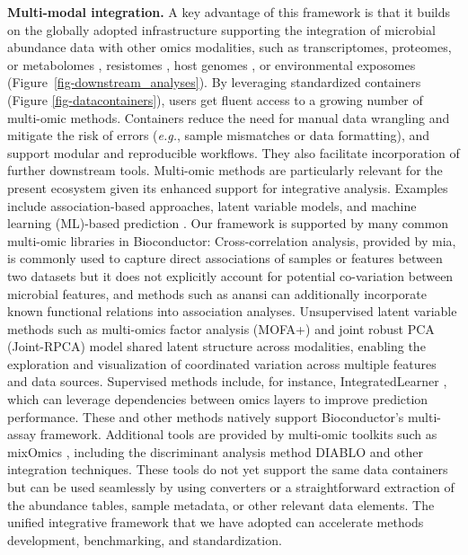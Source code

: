 \documentclass[
  sn-nature,
]{sn-jnl}
\begin{document}
\textbf{Multi-modal integration.} A key advantage of this framework is
that it builds on the globally adopted infrastructure supporting the
integration of microbial abundance data with other omics modalities,
such as transcriptomes, proteomes, or metabolomes
\citep{hintikka2021, mangnier2025}, resistomes
\citep{salehi2025, lee2023}, host genomes \citep{qin2022}, or
environmental exposomes (Figure~\ref{fig-downstream_analyses}). By
leveraging standardized containers (Figure \ref{fig-datacontainers}),
users get fluent access to a growing number of multi-omic methods.
Containers reduce the need for manual data wrangling and mitigate the
risk of errors (\emph{e.g.}, sample mismatches or data formatting), and
support modular and reproducible workflows. They also facilitate
incorporation of further downstream tools. Multi-omic methods are
particularly relevant for the present ecosystem given its enhanced
support for integrative analysis. Examples include association-based
approaches, latent variable models, and machine learning (ML)-based
prediction \citep{sankaran2019, sankaran2019b, sherwani2025}. Our
framework is supported by many common multi-omic libraries in
Bioconductor: Cross-correlation analysis, provided by mia, is commonly
used to capture direct associations of samples or features between two
datasets but it does not explicitly account for potential co-variation
between microbial features, and methods such as anansi
\citep{bastiaanssen2023} can additionally incorporate known functional
relations into association analyses. Unsupervised latent variable
methods such as multi-omics factor analysis (MOFA+)
\citep{argelaguet2020} and joint robust PCA (Joint-RPCA)
\citep{vargas2026} model shared latent structure across modalities,
enabling the exploration and visualization of coordinated variation
across multiple features and data sources. Supervised methods include,
for instance, IntegratedLearner \citep{mallick2024}, which can leverage
dependencies between omics layers to improve prediction performance.
These and other methods natively support Bioconductor's multi-assay
framework. Additional tools are provided by multi-omic toolkits such as
mixOmics \citep{rohart2017}, including the discriminant analysis method
DIABLO \citep{singh2019} and other integration techniques. These tools
do not yet support the same data containers but can be used seamlessly
by using converters or a straightforward extraction of the abundance
tables, sample metadata, or other relevant data elements. The unified
integrative framework that we have adopted can accelerate methods
development, benchmarking, and standardization.
\end{document}
